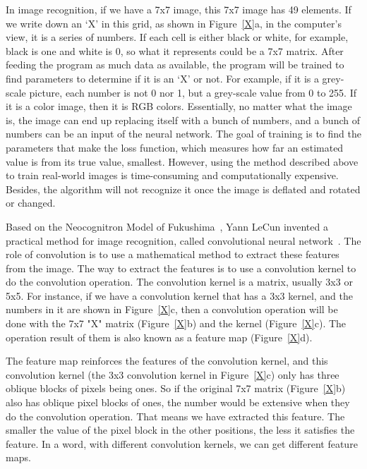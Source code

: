 In image recognition, if we have a 7x7 image, this 7x7 image has 49 elements. If we write down an `X' in this grid, as shown in Figure~\ref{X}a, in the computer's view, it is a series of numbers. If each cell is either black or white, for example, black is one and white is 0, so what it represents could be a 7x7 matrix. After feeding the program as much data as available, the program will be trained to find parameters to determine if it is an `X' or not. For example, if it is a grey-scale picture, each number is not 0 nor 1, but a grey-scale value from 0 to 255. If it is a color image, then it is RGB colors. Essentially, no matter what the image is, the image can end up replacing itself with a bunch of numbers, and a bunch of numbers can be an input of the neural network. The goal of training is to find the parameters that make the loss function, which measures how far an estimated value is from its true value, smallest. However, using the method described above to train real-world images is time-consuming and computationally expensive. Besides, the algorithm will not recognize it once the image is deflated and rotated or changed.


Based on the Neocognitron Model of Fukushima~\cite{fukushima1982neocognitron}, Yann LeCun invented a practical method for image recognition, called convolutional neural network~\cite{lecun1995convolutional}. The role of convolution is to use a mathematical method to extract these features from the image. The way to extract the features is to use a convolution kernel to do the convolution operation. The convolution kernel is a matrix, usually 3x3 or 5x5. For instance, if we have a convolution kernel that has a 3x3 kernel, and the numbers in it are shown in Figure~\ref{X}c, then a convolution operation will be done with the 7x7 "X" matrix (Figure~\ref{X}b) and the kernel (Figure~\ref{X}c). The operation result of them is also known as a feature map (Figure~\ref{X}d).


The feature map reinforces the features of the convolution kernel, and this convolution kernel (the 3x3 convolution kernel in Figure~\ref{X}c) only has three oblique blocks of pixels being ones. So if the original 7x7 matrix (Figure~\ref{X}b) also has oblique pixel blocks of ones, the number would be extensive when they do the convolution operation. That means we have extracted this feature. The smaller the value of the pixel block in the other positions, the less it satisfies the feature. In a word, with different convolution kernels, we can get different feature maps.


